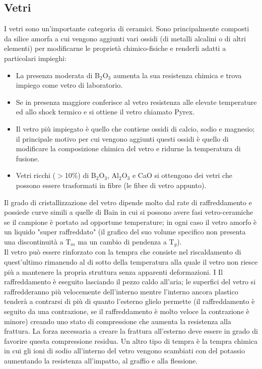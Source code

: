 \subsection{Vetri}

I vetri sono un'importante categoria di ceramici. Sono principalmente composti da silice amorfa a cui vengono aggiunti vari ossidi (di metalli alcalini o di altri elementi) per modificarne le proprietà chimico-fisiche e renderli adatti a particolari impieghi:
\begin{itemize}
    \item La presenza moderata di B$_2$O$_3$ aumenta la sua resistenza chimica e trova impiego come vetro di laboratorio.
    \item Se in presenza maggiore conferisce al vetro resistenza alle elevate temperature ed allo shock termico e si ottiene il vetro chiamato Pyrex.
    \item Il vetro più impiegato è quello che contiene ossidi di calcio, sodio e magnesio; il principale motivo per cui vengono aggiunti questi ossidi è quello di modificare la composizione chimica del vetro e ridurne la temperatura di fusione.
    \item Vetri ricchi ($>$10\%) di B$_2$O$_3$, Al$_2$O$_3$ e CaO si ottengono dei vetri che possono essere trasformati in fibre (le fibre di vetro appunto).
\end{itemize}
Il grado di cristallizzazione del vetro dipende molto dal rate di raffreddamento e possiede curve simili a quelle di Bain in cui si possono avere fasi vetro-ceramiche se il campione è portato ad opportune temperature; in ogni caso il vetro amorfo è un liquido "super raffreddato" (il grafico del suo volume specifico non presenta una discontinuità a T$_m$ ma un cambio di pendenza a T$_g$).\\
Il vetro può essere rinforzato con la tempra che consiste nel riscaldamento di quest'ultimo rimanendo al di sotto della temperatura alla quale il vetro non riesce più a mantenere la propria struttura senza apparenti deformazioni. I
Il raffreddamento è eseguito lasciando il pezzo caldo all'aria; le superfici del vetro si raffredderanno più velocemente dell'interno mentre l'interno ancora plastico tenderà a contrarsi di più di quanto l'esterno glielo permette (il raffreddamento è seguito da una contrazione, se il raffreddamento è molto veloce la contrazione è minore) creando uno stato di compressione che aumenta la resistenza alla frattura. La forza necessaria a creare la frattura all'esterno deve essere in grado di favorire questa compressione residua. Un altro tipo di tempra è la tempra chimica in cui gli ioni di sodio all'interno del vetro vengono scambiati con del potassio aumentando la resistenza all'impatto, al graffio e alla flessione.
